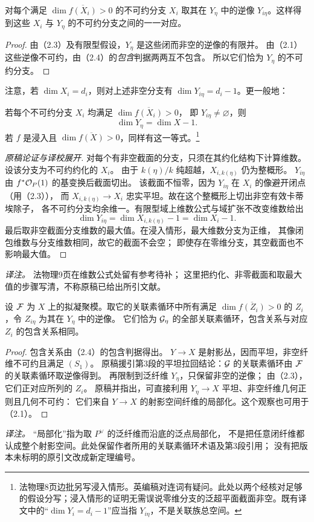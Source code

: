 对每个满足 \(\dim\overline{f(X_i)}>0\) 的不可约分支 \(X_i\) 取其在 \(Y_\eta\) 中的逆像
\(Y_{i\eta}\)。这样得到这些 \(X_i\) 与 \(Y_\eta\) 的不可约分支之间的一一对应。
\begin{proof}
由（2.3）及有限型假设，\(Y_\eta\) 是这些闭而非空的逆像的有限并。
由（2.1）这些逆像不可约，由（2.4）的\emph{包含}判据两两互不包含。
所以它们恰为 \(Y_\eta\) 的不可约分支。
\end{proof}

注意，若 $\dim X_i=d_i$，则对上述非空分支有 $\dim Y_{i\eta}=d_i-1$。更一般地：

若每个不可约分支 \(X_i\) 均满足 \(\dim\overline{f(X_i)}>0\)，
即 \(Y_{i\eta}\ne\varnothing\)，则
\[
 \dim Y_\eta=\dim X-1.
\]
若 \(f\) 是浸入且 \(\dim\overline{f(X)}>0\)，同样有这一等式。\footnote{法物理8页边批另写浸入情形。英编稿对连词有疑问。此处以两个经核对足够的假设分写；浸入情形的证明无需误说零维分支的泛超平面截面非空。既有译文中的“\(\dim Y_i=d_i-1\)”应当指 \(Y_{i\eta}\)，不是关联族总空间。}
\begin{proof}[原稿论证与译校展开]
对每个有非空截面的分支，只须在其约化结构下计算维数。设该分支为不可约约化的 \(X_i\)。
由于 \(k(\eta)/k\) 纯超越，\(X_{i,k(\eta)}\) 仍为整概形。
\(Y_{i\eta}\) 由 \(f^*\mathcal O_P(1)\) 的基变换后截面切出。
该截面不恒零，因为 \(Y_{i\eta}\) 在 \(X_i\) 的像避开闭点（用（2.3）），
而 \(X_{i,k(\eta)}\to X_i\) 忠实平坦。故在这个整概形上切出非空有效卡蒂埃除子，
各不可约分支均余维一。有限型域上维数公式与域扩张不改变维数给出
\[
 \dim Y_{i\eta}=\dim X_{i,k(\eta)}-1=\dim X_i-1.
\]
最后取非空截面分支维数的最大值。在浸入情形，最大维数分支为正维，
其像闭包维数与分支维数相同，故它的截面不会空；
即使存在零维分支，其空截面也不影响最大值。
\end{proof}
\noindent\emph{译注。} 法物理9页在维数公式处留有参考待补；
这里把约化、非零截面和取最大值的步骤写清，不称原稿已给出所引文献。

设 \(\mathcal F\) 为 \(X\) 上的拟凝聚模。取它的关联素循环中所有满足
\(\dim\overline{f(Z_i)}>0\) 的 \(Z_i\)，令 \(Z_{i\eta}\) 为其在 \(Y_\eta\) 中的逆像。
它们恰为 \(\mathcal G_\eta\) 的全部关联素循环，包含关系与对应 \(Z_i\) 的包含关系相同。
\begin{proof}
包含关系由（2.4）的包含判据得出。
\(Y\to X\) 是射影丛，因而平坦，非空纤维不可约且满足 \((S_1)\)。
原稿援引第3段的平坦拉回结论：\(\mathcal G\) 的关联素循环由 \(\mathcal F\) 的关联素循环取逆像得到。
再限制到泛纤维 \(Y_\eta\)，只保留非空的逆像；
由（2.3），它们正对应所列的 \(Z_i\)。
原稿并指出，可直接利用 \(Y_\eta\to X\) 平坦、非空纤维几何正则且几何不可约：
它们来自 \(Y\to X\) 的射影空间纤维的局部化。这个观察也可用于（2.1）。
\end{proof}
\noindent\emph{译注。} “局部化”指为取 \(P^\vee\) 的泛纤维而沿底的泛点局部化，
不是把任意闭纤维都认成整个射影空间。此处保留作者所用的关联素循环术语及第3段引用；
没有把版本未标明的原引文改成新定理编号。

\endgroup
